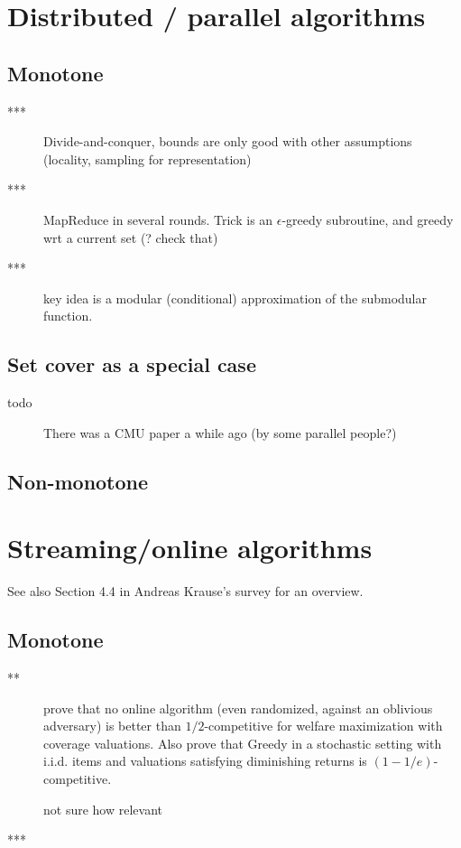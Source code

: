 \documentclass{article}
\begin{document}
\section{Distributed / parallel algorithms}

\subsection{Monotone}

\begin{description}
\item[\citet{Mirzasoleiman2013}***] Divide-and-conquer, bounds are only good with other assumptions (locality, sampling for representation)
\item[\citet{kumar13}***] MapReduce in several rounds. Trick is an $\epsilon$-greedy subroutine, and greedy wrt a current set (? check that)
\item[\citet{wei14}***] key idea is a modular (conditional) approximation of the submodular function. 
\end{description}

\subsection{Set cover as a special case}

\begin{description}
\item[todo] There was a CMU paper a while ago (by some parallel people?)
\end{description}

\subsection{Non-monotone}



\section{Streaming/online algorithms}

See also Section 4.4 in Andreas Krause's survey for an overview.

\subsection{Monotone}

\begin{description}
\item[\citet{kapralov13}**] prove that no online algorithm (even randomized, against an oblivious adversary) is better than $1/2$-competitive for welfare maximization with coverage valuations. Also prove that Greedy in a stochastic setting with i.i.d. items and valuations satisfying diminishing returns is $(1-1/e)$-competitive.
\item[\citet{buchbinder12}] not sure how relevant
\item[\citet{feldman11sec}***] 
\end{description}
\end{document}
